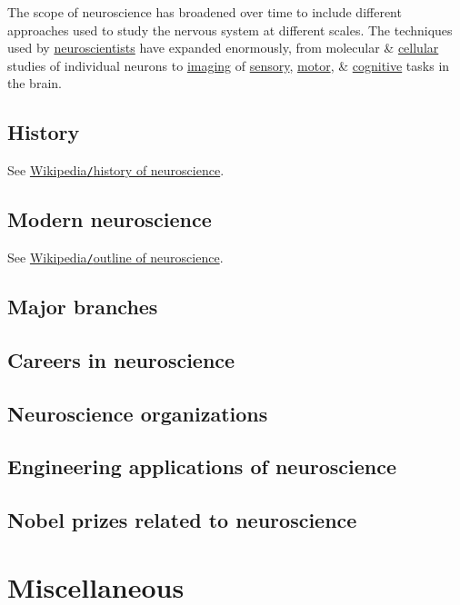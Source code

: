 \documentclass{article}
\begin{document}
The scope of neuroscience has broadened over time to include different approaches used to study the nervous system at different scales. The techniques used by \href{https://en.wikipedia.org/wiki/Neuroscientist}{neuroscientists} have expanded enormously, from molecular \& \href{https://en.wikipedia.org/wiki/Cell_biology}{cellular} studies of individual neurons to \href{https://en.wikipedia.org/wiki/Neuroimaging}{imaging} of \href{https://en.wikipedia.org/wiki/Sensory_neuron}{sensory}, \href{https://en.wikipedia.org/wiki/Motor_neuron}{motor}, \& \href{https://en.wikipedia.org/wiki/Cognition}{cognitive} tasks in the brain.

\subsection{History}
See \href{https://en.wikipedia.org/wiki/History_of_neuroscience}{Wikipedia{\tt/}history of neuroscience}.

\subsection{Modern neuroscience}
See \href{https://en.wikipedia.org/wiki/Outline_of_neuroscience}{Wikipedia{\tt/}outline of neuroscience}.

\subsection{Major branches}

\subsection{Careers in neuroscience}

\subsection{Neuroscience organizations}

\subsection{Engineering applications of neuroscience}

\subsection{Nobel prizes related to neuroscience}


\section{Miscellaneous}


\printbibliography[heading=bibintoc]
	
\end{document}
